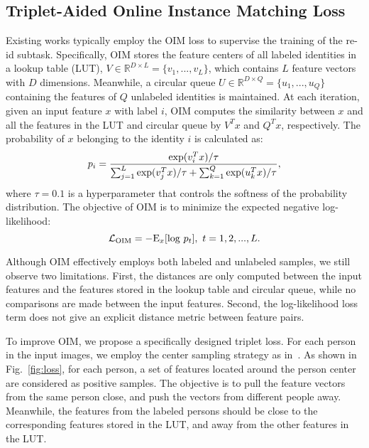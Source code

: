 \documentclass[journal]{IEEEtran}
\begin{document}
\subsection{Triplet-Aided Online Instance Matching Loss}
Existing works typically employ the OIM loss to supervise the training of the re-id subtask. Specifically, OIM stores the feature centers of all labeled identities in a lookup table (LUT), $V \in \mathbb{R}^{D \times L} = \{v_1,...,v_L\}$, which contains $L$ feature vectors with $D$ dimensions. Meanwhile, a circular queue $U \in \mathbb{R}^{D \times Q}= \{u_1,...,u_Q\}$ containing the features of $Q$ unlabeled identities is maintained. At each iteration, given an input feature $x$ with label $i$, OIM computes the similarity between $x$ and all the features in the LUT and circular queue by $V^T x$ and $Q^T x$, respectively. The probability of $x$ belonging to the identity $i$ is calculated as:
\begin{equation}
    p_i = \frac{{\rm exp}(v_i^T x) / \tau}{\sum_{j=1}^{L}{\rm exp}(v_j^T x) / \tau + \sum_{k=1}^{Q}{\rm exp}(u_k^T x) / \tau}, \label{eq:one}
\end{equation}
where $\tau=0.1$ is a hyperparameter that controls the softness of the probability distribution. The objective of OIM is to minimize the expected negative log-likelihood:
\begin{equation}
    \mathcal{L}_{\text{OIM}} = -{\rm E}_x[{\rm log}~p_t], \ t = 1, 2, ..., L.
\end{equation}

Although OIM effectively employs both labeled and unlabeled samples, we still observe two limitations. First, the distances are only computed between the input features and the features stored in the lookup table and circular queue, while no comparisons are made between the input features. Second, the log-likelihood loss term does not give an explicit distance metric between feature pairs. 

To improve OIM, we propose a specifically designed triplet loss. For each person in the input images, we employ the center sampling strategy as in~\cite{DBLP:journals/tip/KongSLJLS20}. As shown in Fig.~\ref{fig:loss}, for each person, a set of features located around the person center are considered as positive samples. The objective is to pull the feature vectors from the same person close, and push the vectors from different people away. Meanwhile, the features from the labeled persons should be close to the corresponding features stored in the LUT, and away from the other features in the LUT.
\end{document}
